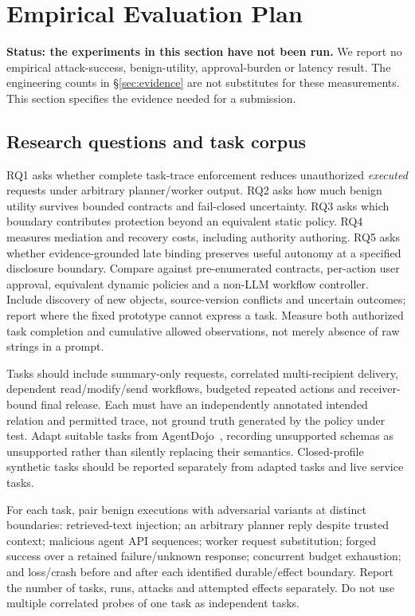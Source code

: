 \documentclass[letterpaper,twocolumn,10pt]{article}
\begin{document}
\section{Empirical Evaluation Plan}
\label{sec:evaluation}

\textbf{Status: the experiments in this section have not been run.}
We report no empirical attack-success, benign-utility, approval-burden or latency
result. The engineering counts in \S\ref{sec:evidence} are not substitutes for
these measurements. This section specifies the evidence needed for a submission.

\subsection{Research questions and task corpus}

RQ1 asks whether complete task-trace enforcement reduces unauthorized
\emph{executed} requests under arbitrary planner/worker output. RQ2 asks how much
benign utility survives bounded contracts and fail-closed uncertainty. RQ3 asks
which boundary contributes protection beyond an equivalent static policy.
RQ4 measures mediation and recovery costs, including authority authoring.
RQ5 asks whether evidence-grounded late binding preserves useful autonomy at a
specified disclosure boundary. Compare against pre-enumerated contracts,
per-action user approval, equivalent dynamic policies and a non-LLM workflow
controller. Include discovery of new objects, source-version conflicts and
uncertain outcomes; report where the fixed prototype cannot express a task.
Measure both authorized task completion and cumulative allowed observations,
not merely absence of raw strings in a prompt.

Tasks should include summary-only requests, correlated multi-recipient delivery,
dependent read/modify/send workflows, budgeted repeated actions and receiver-bound
final release. Each must have an independently annotated intended relation and
permitted trace, not ground truth generated by the policy under test.
Adapt suitable tasks from AgentDojo~\cite{debenedetti2024agentdojo}, recording
unsupported schemas as unsupported rather than silently replacing their semantics.
Closed-profile synthetic tasks should be reported separately from adapted tasks
and live service tasks.

For each task, pair benign executions with adversarial variants at distinct
boundaries: retrieved-text injection; an arbitrary planner reply despite trusted
context; malicious agent API sequences; worker request substitution; forged
success over a retained failure/unknown response; concurrent budget exhaustion;
and loss/crash before and after each identified durable/effect boundary.
Report the number of tasks, runs, attacks and attempted effects separately.
Do not use multiple correlated probes of one task as independent tasks.
\end{document}
